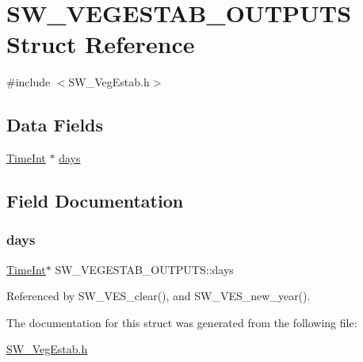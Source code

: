 \hypertarget{struct_s_w___v_e_g_e_s_t_a_b___o_u_t_p_u_t_s}{}\section{S\+W\+\_\+\+V\+E\+G\+E\+S\+T\+A\+B\+\_\+\+O\+U\+T\+P\+U\+TS Struct Reference}
\label{struct_s_w___v_e_g_e_s_t_a_b___o_u_t_p_u_t_s}


{\ttfamily \#include $<$S\+W\+\_\+\+Veg\+Estab.\+h$>$}

\subsection*{Data Fields}
\begin{DoxyCompactItemize}
\item 
\hyperlink{_times_8h_a25ac787161a5cad0e3fdfe5a5aeb3236}{Time\+Int} $\ast$ \hyperlink{struct_s_w___v_e_g_e_s_t_a_b___o_u_t_p_u_t_s_a1c2139d0c89d0adfd3a3ace8a416dca7}{days}
\end{DoxyCompactItemize}


\subsection{Field Documentation}
\mbox{\label{struct_s_w___v_e_g_e_s_t_a_b___o_u_t_p_u_t_s_a1c2139d0c89d0adfd3a3ace8a416dca7}} 
\subsubsection{\texorpdfstring{days}{days}}
{\footnotesize\ttfamily \hyperlink{_times_8h_a25ac787161a5cad0e3fdfe5a5aeb3236}{Time\+Int}$\ast$ S\+W\+\_\+\+V\+E\+G\+E\+S\+T\+A\+B\+\_\+\+O\+U\+T\+P\+U\+T\+S\+::days}



Referenced by S\+W\+\_\+\+V\+E\+S\+\_\+clear(), and S\+W\+\_\+\+V\+E\+S\+\_\+new\+\_\+year().



The documentation for this struct was generated from the following file\+:\begin{DoxyCompactItemize}
\item 
\hyperlink{_s_w___veg_estab_8h}{S\+W\+\_\+\+Veg\+Estab.\+h}\end{DoxyCompactItemize}
